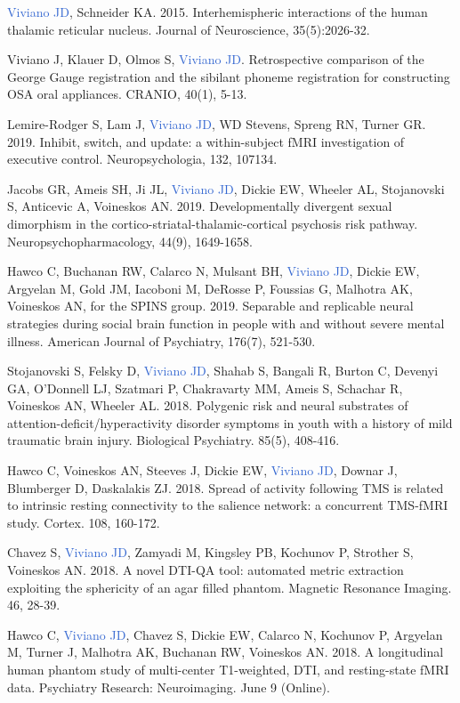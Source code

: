 \documentclass[a4paper,11pt,oneside]{book}
\newcommand\paper[1]{
    #1\\
    \vspace{3.5mm}
}
\begin{document}
\begin{flushleft}
\paper{\textcolor{highlight}{Viviano JD}, Schneider KA. 2015. Interhemispheric interactions of the human thalamic reticular nucleus. Journal of Neuroscience, 35(5):2026-32.}

\paper{Viviano J, Klauer D, Olmos S, \textcolor{highlight}{Viviano JD}. Retrospective comparison of the George Gauge\texttrademark{} registration and the sibilant phoneme registration for constructing OSA oral appliances. CRANIO, 40(1), 5-13.}

\paper{Lemire-Rodger S, Lam J, \textcolor{highlight}{Viviano JD}, WD Stevens, Spreng RN, Turner GR. 2019. Inhibit, switch, and update: a within-subject fMRI investigation of executive control. Neuropsychologia, 132, 107134.}

\paper{Jacobs GR, Ameis SH, Ji JL, \textcolor{highlight}{Viviano JD}, Dickie EW, Wheeler AL, Stojanovski S, Anticevic A, Voineskos AN. 2019. Developmentally divergent sexual dimorphism in the cortico-striatal-thalamic-cortical psychosis risk pathway. Neuropsychopharmacology, 44(9), 1649-1658.}

\paper{Hawco C, Buchanan RW, Calarco N, Mulsant BH, \textcolor{highlight}{Viviano JD}, Dickie EW, Argyelan M, Gold JM, Iacoboni M, DeRosse P, Foussias G, Malhotra AK, Voineskos AN, for the SPINS group. 2019. Separable and replicable neural strategies during social brain function in people with and without severe mental illness. American Journal of Psychiatry, 176(7), 521-530.}

\paper{Stojanovski S, Felsky D, \textcolor{highlight}{Viviano JD}, Shahab S, Bangali R, Burton C, Devenyi GA, O'Donnell LJ, Szatmari P, Chakravarty MM, Ameis S, Schachar R, Voineskos AN, Wheeler AL. 2018. Polygenic risk and neural substrates of attention-deficit/hyperactivity disorder symptoms in youth with a history of mild traumatic brain injury. Biological Psychiatry. 85(5), 408-416.}

\paper{Hawco C, Voineskos AN,  Steeves J, Dickie EW, \textcolor{highlight}{Viviano JD}, Downar J, Blumberger D, Daskalakis ZJ. 2018. Spread of activity following TMS is related to intrinsic resting connectivity to the salience network: a concurrent TMS-fMRI study. Cortex. 108, 160-172.}

\paper{Chavez S, \textcolor{highlight}{Viviano JD}, Zamyadi M, Kingsley PB, Kochunov P, Strother S, Voineskos AN. 2018. A novel DTI-QA tool: automated metric extraction exploiting the sphericity of an agar filled phantom. Magnetic Resonance Imaging. 46, 28-39.}

\paper{Hawco C, \textcolor{highlight}{Viviano JD}, Chavez S, Dickie EW, Calarco N, Kochunov P, Argyelan M, Turner J, Malhotra AK, Buchanan RW, Voineskos AN. 2018. A longitudinal human phantom study of multi-center T1-weighted, DTI, and resting-state fMRI data. Psychiatry Research: Neuroimaging. June 9 (Online).}


\end{flushleft}
\end{document}
